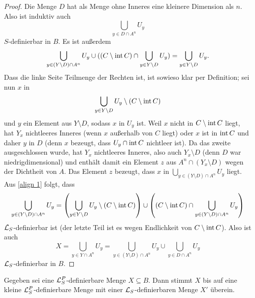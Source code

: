 \begin{proof}
	Die Menge $D$ hat als Menge ohne Inneres eine kleinere Dimension als $n$. Also ist induktiv auch $$\bigcup\limits_{y\in D\cap A^n}U_y$$ $S$-definierbar in $B$. Es ist außerdem
	\begin{align}\label{align 1}
	\bigcup\limits_{y\in (Y\setminus D)\cap A^n}U_y\cup((C\setminus\operatorname{int} C)\cap\bigcup\limits_{y\in Y\setminus D}U_y)=\bigcup\limits_{y\in Y\setminus D}U_y.
	\end{align}
	Dass die linke Seite Teilmenge der Rechten ist, ist sowieso klar per Definition; sei nun $x$ in $$\bigcup\limits_{y\in Y\setminus D}U_y\setminus (C\setminus\operatorname{int} C)$$ und $y$ ein Element aus $Y\setminus D$, sodass $x$ in $U_y$ ist. Weil $x$ nicht in $C\setminus\operatorname{int} C$ liegt, hat $Y_x$ nichtleeres Inneres (wenn $x$ außerhalb von $C$ liegt) oder $x$ ist in $\operatorname{int} C$ und daher $y$ in $D$ (denn $x$ bezeugt, dass $U_y\cap\operatorname{int} C$ nichtleer ist). Da das zweite ausgeschlossen wurde, hat $Y_x$ nichtleeres Inneres, also auch $Y_x\setminus D$ (denn $D$ war niedrigdimensional) und enthält damit ein Element $z$ aus $A^n\cap(Y_x\setminus D)$ wegen der Dichtheit von $A$. Das Element $z$ bezeugt, dass $x$ in $\bigcup\limits_{y\in (Y\setminus D)\cap A^n}U_y$ liegt.\\
	Aus \ref{align 1} folgt, dass $$\bigcup\limits_{y\in (Y\setminus D)\cap A^n}U_y=\left(\bigcup\limits_{y\in Y\setminus D}U_y\setminus(C\setminus\operatorname{int} C)\right)\cup\left((C\setminus\operatorname{int} C)\cap\bigcup\limits_{y\in (Y\setminus D)\cap A^n}U_y\right)$$ $\mathcal{L}_S$-definierbar ist (der letzte Teil ist es wegen Endlichkeit von $C\setminus\operatorname{int} C$). Also ist auch $$X=\bigcup\limits_{y\in Y\cap A^n}U_y=\bigcup\limits_{y\in (Y\setminus D)\cap A^n}U_y\cup\bigcup\limits_{y\in D\cap A^n}U_y$$ $\mathcal{L}_S$-definierbar in $B$.
\end{proof}
\newpage
\begin{theorem}
	Gegeben sei eine $\mathcal{L}^P_S$-definierbare Menge $X\subseteq B$. Dann stimmt $X$ bis auf eine kleine $\mathcal{L}^P_S$-definierbare Menge mit einer $\mathcal{L}_S$-definierbaren Menge $X'$ überein.
\end{theorem}
